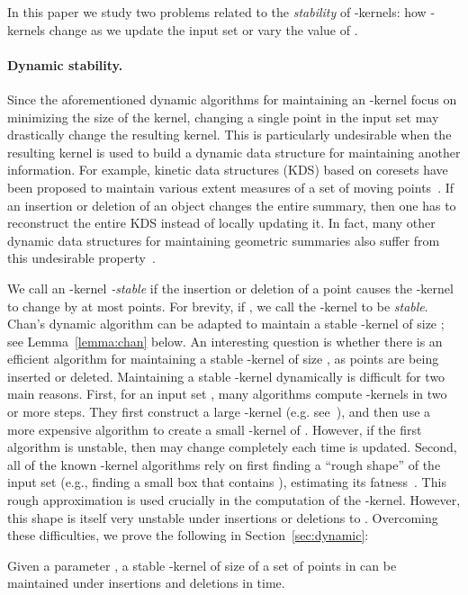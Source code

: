 \documentclass[11pt]{myclass}
\begin{document}
In this paper we study two problems related to the \emph{stability} of 
-kernels: how -kernels change as we update the input set or vary
the value of .


\paragraph{Dynamic stability.}
Since the aforementioned dynamic algorithms for maintaining an
-kernel focus on minimizing the size of the
kernel, changing a single point in the input set  may 
drastically change the resulting kernel.  This is particularly 
undesirable when the resulting kernel is used to build 
a dynamic data structure for maintaining another information.
For example, kinetic data structures (KDS) based on coresets have 
been proposed to maintain various
extent measures of a set of moving points~\cite{AHV07}. If an
insertion or deletion of an object changes the entire summary,
then one has to reconstruct the entire KDS instead of locally
updating it. In fact, many other dynamic data structures for maintaining
geometric summaries also suffer from this undesirable 
property~\cite{BCEG04,HS08,STZ04}.

We call an -kernel
\emph{-stable} if the insertion or deletion of a point 
causes the -kernel to change by at most  points.
For brevity, if , we call the -kernel to be
\emph{stable}. Chan's dynamic algorithm can be adapted to maintain
a stable -kernel of size ; see 
Lemma~\ref{lemma:chan} below.
An interesting question is whether there is an efficient algorithm 
for maintaining a stable -kernel of size
, as points are being inserted or
deleted.  Maintaining a stable -kernel dynamically 
is difficult for two main reasons.  
First, for an input set , many algorithms compute -kernels in 
two or more steps. They first construct a large -kernel 
 (e.g. see~\cite{AHV04,Cha08}), and then use a more 
expensive algorithm to create a small 
-kernel of .  However, if the first algorithm is unstable, then  may change completely each 
time  is updated.  
Second, all of the known -kernel algorithms rely on first finding 
a ``rough shape'' of the input set  (e.g., finding a small
box that contains ), estimating its fatness~\cite{BH01}.  
This rough approximation is used crucially in the computation
of the -kernel.  However, this shape is itself very unstable 
under insertions or deletions to .  Overcoming these
difficulties, we prove the following in
Section~\ref{sec:dynamic}: 


\begin{theorem}
\label{theo:dynamic}
Given a parameter , 
a stable -kernel of size  of a set of  points in  can be maintained under insertions and deletions in  time.
\end{theorem}
\end{document}
